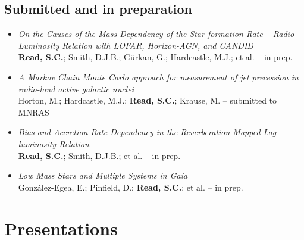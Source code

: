 \documentclass[letterpaper]{twentysecondcv} %
\begin{document}
\begin{finalpages}
\subsection{Submitted and in preparation}
\begin{itemize}
     \item \textit{On the Causes of the Mass Dependency of the Star-formation Rate -- Radio
Luminosity Relation with LOFAR, Horizon-AGN, and CANDID}\\{\small \textbf{Read, S.C.}; Smith, D.J.B.; Gürkan, G.; Hardcastle, M.J.; et al. -- in prep.}
 \item \textit{A Markov Chain Monte Carlo approach for measurement of jet precession in
radio-loud active galactic nuclei}\\{\small Horton, M.; Hardcastle, M.J.; \textbf{Read, S.C.}; Krause, M. -- submitted to MNRAS}
 \item \textit{Bias and Accretion Rate Dependency in the Reverberation-Mapped
Lag-luminosity Relation}\\{\small \textbf{Read, S.C.}; Smith, D.J.B.; et al. -- in prep.}
 \item \textit{Low Mass Stars and Multiple Systems in Gaia}\\{\small González-Egea, E.; Pinfield, D.; \textbf{Read, S.C.}; et al. -- in prep.}
\end{itemize}

\section{Presentations}
\begin{twentyfull}
\end{twentyfull}
\end{finalpages}
\end{document}
